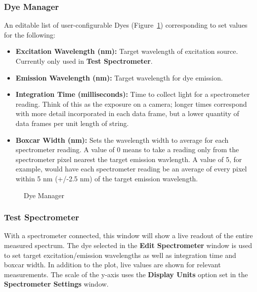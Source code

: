 \documentclass[10pt,letterpaper,titlepage]{article}
\begin{document}
    \subsubsection{Dye Manager}
    An editable list of user-configurable Dyes (Figure~\ref{fig:spectrometer_dye}) corresponding to set values for the following:
    \begin{itemize}
        \item \textbf{Excitation Wavelength (nm):} Target wavelength of excitation source. Currently only used in \textbf{Test Spectrometer}.
        \item \textbf{Emission Wavelength (nm):} Target wavelength for dye emission.
        \item \textbf{Integration Time (milliseconds):} Time to collect light for a spectrometer reading. Think of this as the exposure on a camera; longer times correspond with more detail incorporated in each data frame, but a lower quantity of data frames per unit length of string.
        \item \textbf{Boxcar Width (nm):} Sets the wavelength width to average for each spectrometer reading. A value of 0 means to take a reading only from the spectrometer pixel nearest the target emission wavlength. A value of 5, for example, would have each spectrometer reading be an average of every pixel within 5 nm (+/-2.5 nm) of the target emission wavelength. 
    \end{itemize}

    \begin{figure}[hb]
        \centering
        \caption{Dye Manager}
        \label{fig:spectrometer_dye}
    \end{figure}
    \FloatBarrier
    \newpage

    \subsubsection{Test Spectrometer}
    With a spectrometer connected, this window will show a live readout of the entire measured spectrum. The dye selected in the \textbf{Edit Spectrometer} window is used to set target excitation/emission wavelengths as well as integration time and boxcar width. In addition to the plot, live values are shown for relevant measurements. The scale of the y-axis uses the \textbf{Display Units} option set in the \textbf{Spectrometer Settings} window.
\end{document}
